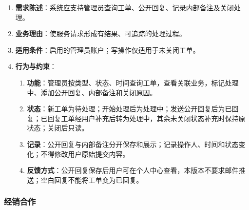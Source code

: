 \begin{enumerate}
\item {\bfseries 需求陈述}：系统应支持管理员查询工单、公开回复、记录内部备注及关闭处理。
\item {\bfseries 业务理由}：使服务请求形成有结果、可追踪的处理过程。
\item {\bfseries 适用条件}：启用的管理员账户；写操作仅适用于未关闭工单。
\item {\bfseries 行为与约束}：
\begin{enumerate}
\item {\bfseries 功能}：管理员按类型、状态、时间查询工单，查看关联业务，标记处理中、添加公开回复、内部备注和关闭原因。
\item {\bfseries 状态}：新工单为待处理；开始处理后为处理中；发送公开回复后为已回复；已回复工单经用户补充后转为处理中，其余未关闭状态补充时保持原状态；关闭后只读。
\item {\bfseries 记录}：公开回复与内部备注分开保存和展示；记录操作人、时间和状态变化；不得修改用户原始提交内容。
\item {\bfseries 反馈方式}：公开回复保存后用户可在个人中心查看，本版本不要求邮件推送；空白回复不能将工单变为已回复。
\end{enumerate}

\end{enumerate}

\subsubsection{经销合作}\label{sec:325-经销合作}


